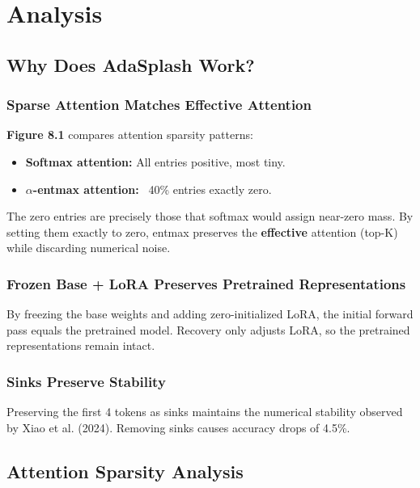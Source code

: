 
\section{Analysis}

\subsection{Why Does AdaSplash Work?}

\subsubsection{Sparse Attention Matches Effective Attention}

\textbf{Figure 8.1} compares attention sparsity patterns:

\begin{itemize}
\item \textbf{Softmax attention:} All entries positive, most tiny.
\item \textbf{$\alpha$-entmax attention:} ~40\% entries exactly zero.

\end{itemize}
The zero entries are precisely those that softmax would assign near-zero 
mass. By setting them exactly to zero, entmax preserves the \textbf{effective} 
attention (top-K) while discarding numerical noise.

\subsubsection{Frozen Base + LoRA Preserves Pretrained Representations}

By freezing the base weights and adding zero-initialized LoRA, the initial 
forward pass equals the pretrained model. Recovery only adjusts LoRA, so 
the pretrained representations remain intact.

\subsubsection{Sinks Preserve Stability}

Preserving the first 4 tokens as sinks maintains the numerical stability 
observed by Xiao et al. (2024). Removing sinks causes accuracy drops of 
4.5\%.

\subsection{Attention Sparsity Analysis}

